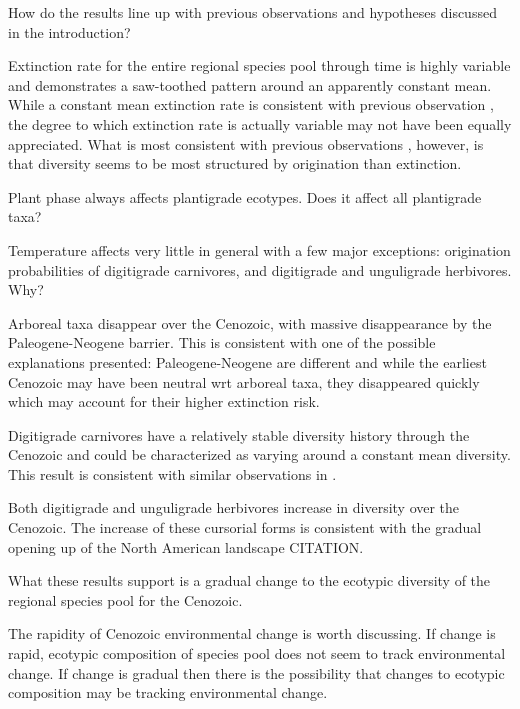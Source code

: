 \documentclass[12pt,letterpaper]{article}
\begin{document}
How do the results line up with previous observations and hypotheses discussed in the introduction? 

Extinction rate for the entire regional species pool through time is highly variable and demonstrates a saw-toothed pattern around an apparently constant mean. While a constant mean extinction rate is consistent with previous observation \citep{Alroy1996a,Alroy2000g}, the degree to which extinction rate is actually variable may not have been equally appreciated. What is most consistent with previous observations \citep{Alroy1996a,Alroy2000g}, however, is that diversity seems to be most structured by origination than extinction.

Plant phase always affects plantigrade ecotypes. Does it affect all plantigrade taxa?

Temperature affects very little in general with a few major exceptions: origination probabilities of digitigrade carnivores, and digitigrade and unguligrade herbivores. Why?

Arboreal taxa disappear over the Cenozoic, with massive disappearance by the Paleogene-Neogene barrier. This is consistent with one of the possible explanations presented: Paleogene-Neogene are different and while the earliest Cenozoic may have been neutral wrt arboreal taxa, they disappeared quickly which may account for their higher extinction risk.

Digitigrade carnivores have a relatively stable diversity history through the Cenozoic and could be characterized as varying around a constant mean diversity. This result is consistent with similar observations in \citet{Slater2015c,Silvestro2015b}.

Both digitigrade and unguligrade herbivores increase in diversity over the Cenozoic. The increase of these cursorial forms is consistent with the gradual opening up of the North American landscape CITATION.



What these results support is a gradual change to the ecotypic diversity of the regional species pool for the Cenozoic.

The rapidity of Cenozoic environmental change is worth discussing. If change is rapid, ecotypic composition of species pool does not seem to track environmental change. If change is gradual then there is the possibility that changes to ecotypic composition may be tracking environmental change.
\end{document}
